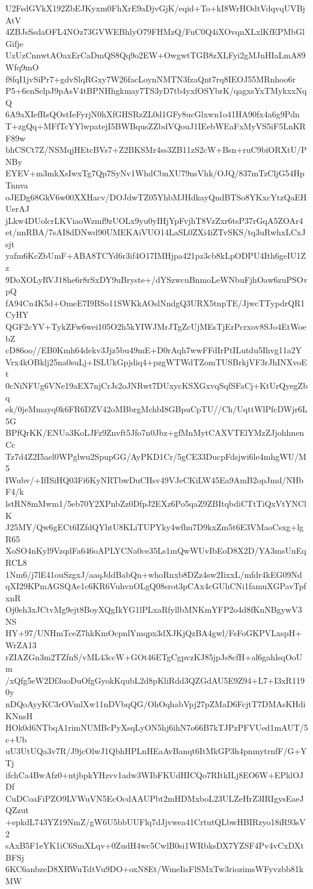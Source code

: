 U2FsdGVkX192ZbEJKyxm0FhXrE9aDjvGjK/eqid+To+kI8WrHOdtVdqvqUVBjAtV
4ZBJsSsdaOFL4NOz73GVWEBhlyO79FHMzQ/FuC0Q4iXOvqnXLxlKfEPMbGlGifje
UzUzCnnwtAOaxErCaDmQS8Qq9o2EW+OwgwtTGB8zXLFyi2gMJnHIaLmA89Wfq9mO
f8fqI1jvSiPr7+gdvSlqRGxy7W26facLoynNMTN3fzaQnt7rq8IEOJ55MRnhoo6r
P5+6enSelpJ9pAsV4tBPNHhgkmay7TS3yD7tb4yxfOSYbrK/qagxsYxTMykxxNqQ
6A9aXIefRsQOstIeFyrjN0hXfGHSRzZL0d1GFy8ucGlxwn1o41HA90fx4a6g9Pdn
T+zgQq+MFfTcYYlwpatejI5BWBqusZZbdVQouJ1IEebWEaFxMyVS5iF5LnKRF89w
bhCSCt7Z/NSMqjHEtcBVs7+Z2BKSMr4ss3ZB11zS2cW+Bsn+ruC9biORXtU/PNBy
EYEV+m3mkXsIwxTg7Qp7SyNv1WhdCbnXU79nsVhk/OJQ/837mTzCljG54HpTnnva
oJEDg68GkV6w00XXHacv/DOJdwTZ05YhbMJHdkayQndBTSo8YKxcYtzQaEHUerAJ
jLkw4DUolcrLKViaoWzmf9zUOLx9yu0yIHjYpFvjhT8VzZxr6tsP37rGqA5ZOAr4
et/nnRBA/7sAI8dDNwd90UMEKAiVUO14LaSL0ZXi4iZTvSKS/tq3uRwhxLCxJsjt
yafm6KcZbUmF+ABA8TCYd6r3if4O17IMHjpa421pz3cb8kLpODPU4Ith6geIU1Zz
9DoXOLyRVJ18he6r8rSxDY9uBryste+/dYSzwcuBnmoLeWNbuFjhOaw6zuPSOvpQ
fA94Cn4K5d+OmeE7I9BSo11SWKkAOslNndgQ3URX5tnpTE/JjwcTTypdrQR1CyHY
QGF2cYV+TykZFw6wei105O2h5kYIWJMrJTgZcUjMEsTjErPcrxov8SJo4EtWoebZ
cD86oo//EB0Kmh64dekv3Jjz5bu49mE+D0rAqh7wwFFdIrPtILutdu5Ihvg11a2Y
Vrx4kOBklj25na0suLj+ISLUkGpjdiq4+pzgWTWdTZomTUSBrkjVF3rJhINXvoEt
0cNiNFUg6VNe19aEX7njCrJs2oJNRwt7DUxycKSXGxvqSqfSFaCj+KtUrQyegZbq
ek/0jeMmayq0k6FR6DZV42oMBbrgMchbI8GBpuCpTU//Ch/UqttWlPfcDWjr6L5G
BPfQrKK/ENUa3KoLJFz9Znvft5Jfo7n0Jbz+gfMnMytCAXVTElYMzZJjohhnenCc
Tz7d4Z2I5ael0WPglwu2SpupGG/AyPKD1Cr/5gCE33DucpFdsjwi6le4mhgWU/M5
IWubv/+IfISiHQ03Fi6KyNRTbwDuCHsv49VJeCKiLW45Ea9AmB2opJmd/NHbF4/k
lstRN8mMwm1/5eb70Y2XPnbZz0DfpJ2EXz6Po5qaZ9ZBItqbdiCTtTiQxVtYNClK
J25MY/Qw6gECt6IZfdQYhtU8KLiTUPYky4wfhu7D9kxZm5t6E3VMaoCsxg+lgR65
XoSO4nKyl9VzqdFa646oAPLYCNa0ce35Ls1mQwWUvIbEoD8X2D/YA3msUnEqRCL8
1Nm6/j7lE41ouSzgxJ/aaqJddBabQn+whoRnxb8DZz4sw2IixxL/mfdr4kEG09Nd
qXI29KPmAGSQAe1c6KR6VuhvnOLgQ08srot3pCAx4cGUhCNi1famuXGPavTpfxnR
Oj0eh3xJCtvMg9ejt8BoyXQgIkYG1lPLxaRfyllbMNKmYFP2o4d8fKnNBgywV3NS
HY+97/UNHmTceZ7hkKmOcpnlYmqpx3dXJKjQzBA4gwl/FsFoGKPVLxspH+WrZA13
rZIAZGn3m2TZfnS/vML43ccW+GOt46ETgCgpvzKJ85jpJs8cfH+al6gahlsqOoUm
/xQfg5eW2Df3uoDuOfgGyokKqubL2d8pKliRdd3QZGdAU5E9Z94+L7+I3xR1190y
nDQoAyyKC3rOVmlXw11nDVbqQG/OhOqhabVpj27pZMaD6FcjtT7DMAsKHdiKNnsH
HOk0d6NTbqA1rimNUMBcPyXsqLyON5hj6ihN7o66B7kTJPzPFVUed1mAUT/5c+Ub
uU3UtUQa3v7R/J9jcOlwJ1QbhHPLnHEaAvBanqt6ItMkGP3h4pnmytrnfF/G+YTj
ifchCa4BwAfz0+ntjbpkYHzvv1adw3WIbFKUdHICQo7RItkILj8EO6W+EPklOJDf
CuDCoaFiPZO9LVWuVN5EcOcdAAUPbt2mHDMxboL23ULZeHrZ3IRIgysEaeJQZzut
+epkdL743YZ19NmZ/gW6U5bbUUFlq7dJjvwea41CrtutQLbwHBIRzyo18iR93sV2
sAxB5F1eYK1iC6SmXLqv+0ZudH4wc5CwlB0si1WRbksDX7YZSF4Pv4vCxDXtBFSj
6KC6anbzeD8XRWuTdtVu9DO+oxN8Et/WmeIisFlSMxTw3riozimsWFyvzbb81kMW
